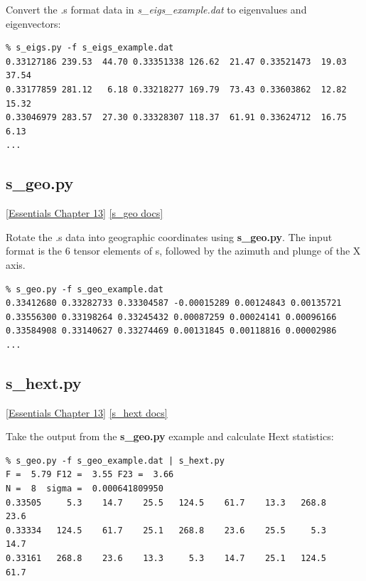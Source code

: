\documentclass[11pt]{book}
\begin{document}
{{Convert the .s format data in {\it s\_eigs\_example.dat} to eigenvalues and eigenvectors:

\begin{verbatim}
% s_eigs.py -f s_eigs_example.dat 
0.33127186 239.53  44.70 0.33351338 126.62  21.47 0.33521473  19.03  37.54
0.33177859 281.12   6.18 0.33218277 169.79  73.43 0.33603862  12.82  15.32
0.33046979 283.57  27.30 0.33328307 118.37  61.91 0.33624712  16.75   6.13
...
\end{verbatim} 

\subsection{s\_geo.py} 
\href{http://magician.ucsd.edu/Essentials_2/WebBook2ch13.html#ch13}{[Essentials Chapter 13]}
\href{http://earthref.org/PmagPy/pmagpydocs/s_geo-module.html}{[s\_geo docs]}

Rotate the .s data into geographic coordinates using {\bf s\_geo.py}.  The input format is the 6 tensor elements of s, followed by the azimuth and plunge of the X axis.   

\begin{verbatim}
% s_geo.py -f s_geo_example.dat
0.33412680 0.33282733 0.33304587 -0.00015289 0.00124843 0.00135721 
0.33556300 0.33198264 0.33245432 0.00087259 0.00024141 0.00096166 
0.33584908 0.33140627 0.33274469 0.00131845 0.00118816 0.00002986 
... 
\end{verbatim}

\subsection{s\_hext.py} 
\href{http://magician.ucsd.edu/Essentials_2/WebBook2ch13.html#ch13}{[Essentials Chapter 13]}
\href{http://earthref.org/PmagPy/pmagpydocs/s_hext-module.html}{[s\_hext docs]}


Take the output from the {\bf s\_geo.py} example and calculate Hext statistics:

\begin{verbatim}
% s_geo.py -f s_geo_example.dat | s_hext.py
F =  5.79 F12 =  3.55 F23 =  3.66
N =  8  sigma =  0.000641809950
0.33505     5.3    14.7    25.5   124.5    61.7    13.3   268.8    23.6
0.33334   124.5    61.7    25.1   268.8    23.6    25.5     5.3    14.7
0.33161   268.8    23.6    13.3     5.3    14.7    25.1   124.5    61.7

\end{verbatim}

}}
\end{document}
